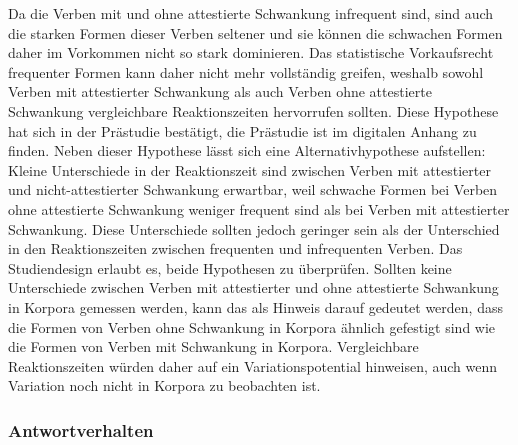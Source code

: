 \begin{enumerate}
\begin{sloppypar}
Da die Verben mit und ohne attestierte Schwankung infrequent sind, sind auch die starken Formen dieser Verben seltener und sie können die schwachen Formen daher im Vorkommen nicht so stark dominieren. Das statistische Vorkaufsrecht frequenter Formen kann daher nicht mehr vollständig greifen, weshalb sowohl Verben mit attestierter Schwankung als auch Verben ohne attestierte Schwankung vergleichbare Reaktionszeiten hervorrufen sollten. Diese Hypothese hat sich in der Prästudie bestätigt, die Prästudie ist im digitalen Anhang zu finden. Neben dieser Hypothese lässt sich eine Alternativhypothese aufstellen: Kleine Unterschiede in der Reaktionszeit sind zwischen Verben mit attestierter und nicht-attestierter Schwankung erwartbar, weil schwache Formen bei Verben ohne attestierte Schwankung weniger frequent sind als bei Verben mit attestierter Schwankung. Diese Unterschiede sollten jedoch geringer sein als der Unterschied in den Reaktionszeiten zwischen frequenten und infrequenten Verben. Das Studiendesign erlaubt es, beide Hypothesen zu überprüfen.  Sollten keine Unterschiede zwischen Verben mit attestierter und ohne attestierte Schwankung in Korpora gemessen werden, kann das als Hinweis darauf gedeutet werden, dass die Formen von Verben ohne Schwankung in Korpora ähnlich gefestigt sind wie die Formen von Verben mit Schwankung in Korpora. Vergleichbare Reaktionszeiten würden daher auf ein Variationspotential hinweisen, auch wenn Variation noch nicht in Korpora zu beobachten ist.
\end{sloppypar}
\end{enumerate}

\subsubsection{Antwortverhalten}

